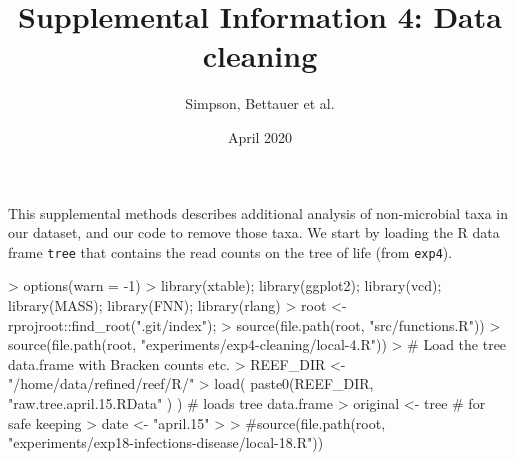 \documentclass{article}
\title{Supplemental Information 4: Data cleaning }
\date{April 2020}
\author{Simpson, Bettauer et al.}
\begin{document}


\maketitle

This supplemental methods describes additional analysis of non-microbial taxa in our dataset,
and our code to remove those taxa.
We start by loading the R data frame {\tt tree} that contains the read counts on the tree of life (from {\tt exp4}).

\begin{Schunk}
\begin{Sinput}
> options(warn = -1)
> library(xtable); library(ggplot2); library(vcd); library(MASS); library(FNN); library(rlang)
> root <- rprojroot::find_root(".git/index"); 
> source(file.path(root, "src/functions.R"))
> source(file.path(root, "experiments/exp4-cleaning/local-4.R"))
> # Load the tree data.frame with Bracken counts etc.
> REEF_DIR <- "/home/data/refined/reef/R/"
> load( paste0(REEF_DIR, "raw.tree.april.15.RData" ) )  # loads tree data.frame
> original <- tree # for safe keeping
> date <- "april.15"
> 
> #source(file.path(root, "experiments/exp18-infections-disease/local-18.R"))
\end{Sinput}
\end{Schunk}
\end{document}
